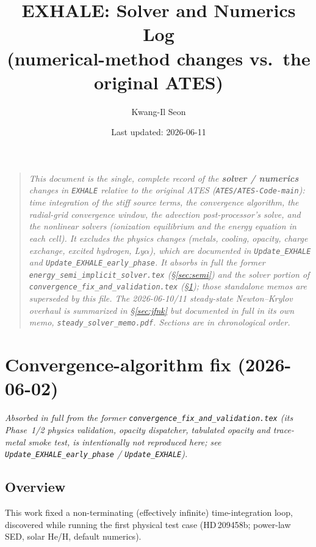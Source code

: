 \documentclass[english,a4paper]{my_memo}
\begin{document}
\title{EXHALE: Solver and Numerics Log\\(numerical-method changes vs.\ the original ATES)}
\author{Kwang-Il Seon}
\date{Last updated: 2026-06-11}
\maketitle

\begin{quote}\small\itshape
This document is the single, complete record of the \textbf{solver / numerics}
changes in \texttt{EXHALE} relative to the original ATES
(\texttt{ATES/ATES-Code-main}): time integration of the stiff source terms, the
convergence algorithm, the radial-grid convergence window, the advection
post-processor's solve, and the nonlinear solvers (ionization equilibrium and the
energy equation in each cell). It \emph{excludes} the physics changes (metals,
cooling, opacity, charge exchange, excited hydrogen, Ly$\alpha$), which are
documented in \texttt{Update\_EXHALE} and \texttt{Update\_EXHALE\_early\_phase}. It
absorbs in full the former
\texttt{energy\_semi\_implicit\_solver.tex} (\S\ref{sec:semi}) and the
solver portion of \texttt{convergence\_fix\_and\_validation.tex}
(\S\ref{sec:conv}); those standalone memos are superseded by this file.
The 2026-06-10/11 steady-state Newton--Krylov overhaul is \emph{summarized}
in \S\ref{sec:jfnk} but documented in full in its own memo,
\texttt{steady\_solver\_memo.pdf}.
Sections are in chronological order.
\end{quote}

\tableofcontents
\bigskip

\section{Convergence-algorithm fix (2026-06-02)}\label{sec:conv}
\emph{Absorbed in full from the former \texttt{convergence\_fix\_and\_validation.tex}
(its Phase~1/2 \emph{physics} validation, opacity dispatcher, tabulated opacity
and trace-metal smoke test, is intentionally not reproduced here; see
\texttt{Update\_EXHALE\_early\_phase} / \texttt{Update\_EXHALE}).}

\subsection{Overview}
This work fixed a non-terminating (effectively infinite) time-integration loop,
discovered while running the first physical test case (HD\,209458b; power-law SED,
solar He/H, default numerics).
\end{document}

